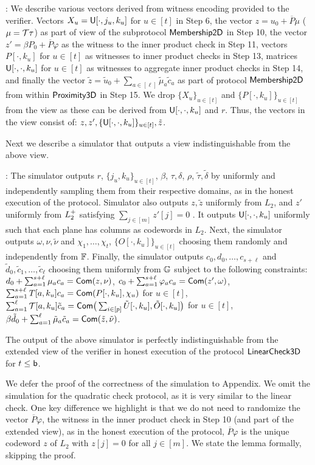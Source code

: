 : We describe various vectors derived from
witness encoding provided to the verifier. Vectors $X_u=\mathsf{U}[\cdot,j_u,k_u]$
for $u\in [t]$ in Step 6, the vector $z=u_0 + \overline{P}\mu$ ($\mu=\mathcal{T}\tau$) as
part of view of the subprotocol $\mathsf{Membership2D}$ in Step 10, the vector
$z'=\beta P_0+\overline{P}\varphi$ as the witness to the inner product check in Step
11, vectors $P[\cdot,k_u]$ for $u\in [t]$ as witnesses to inner product checks
in Step 13, matrices $\mathsf{U}[\cdot,\cdot,k_u]$ for $u\in [t]$ as witnesses to
aggregate inner product checks in Step 14, and finally the vector
$\tilde{z}=\tilde{u}_0 + \sum_{a\in [\ell]}\tilde{\mu}_a\tilde{c}_a$ as part of
protocol $\mathsf{Membership2D}$ from within $\mathsf{Proximity3D}$ in Step 15. We drop
$\{X_u\}_{u\in [t]}$ and $\{P[\cdot,k_u]\}_{u\in [t]}$ from the view as these
can be derived from $\mathsf{U}[\cdot,\cdot,k_u]$ and $r$. Thus, the vectors in the
view consist of: $z,z',\{\mathsf{U}[\cdot,\cdot,k_u]\}_{u\in [t]},\tilde{z}$.

Next we describe a simulator that outputs a view indistinguishable from the
above view.

: The simulator outputs $r$, $\{j_u,k_u\}_{u\in [t]}$,
$\beta$, $\tau,\delta$, $\rho$, $\tilde{\tau},\tilde{\delta}$ by uniformly and
independently sampling them from their respective domains, as in the honest
execution of the protocol. Simulator also outputs $z,\tilde{z}$ uniformly from
$L_2$, and $z'$ uniformly from $L^{+}_2$ satisfying $\sum_{j\in [m]}z'[j]=0$ . It outputs
$\mathsf{U}[\cdot,\cdot,k_u]$ uniformly such that each plane has columns as codewords
in $L_2$. 
Next, the simulator outputs $\omega,\nu,\tilde{\nu}$
and $\chi_1,\ldots,\chi_t$, $\{O[\cdot,k_u]\}_{u\in [t]}$ choosing them randomly and
independently from $\mathbb{F}$. Finally, the simulator outputs
$c_0,d_0,\ldots,c_{s+\ell}$ and $\tilde{d}_0,\tilde{c}_1,\ldots,\tilde{c}_\ell$ choosing 
them uniformly from $\mathbb{G}$ subject to the following constraints:
$d_0 + \sum_{a=1}^{s+\ell}\mu_ac_a = \mathsf{Com}(z,\nu)$,
$c_0 + \sum_{a=1}^{s+\ell}\varphi_ac_a = \mathsf{Com}(z',\omega)$,
$\sum_{a=1}^{s+\ell}T[a,k_u]c_a = \mathsf{Com}(P[\cdot,k_u],\chi_u)$ for $u\in [t]$,
$\sum_{a=1}^{\ell}\mathcal{T}[a,k_u]\tilde{c}_a = \mathsf{Com}\big(\sum_{i\in
[p]}\tilde{U}[\cdot,k_u],\tilde{O}[\cdot, k_u]\big)$ for $u\in [t]$,
$\beta\tilde{d}_0 + \sum_{a=1}^{\ell}\tilde{\mu}_a\tilde{c}_a =
\mathsf{Com}(\tilde{z},\tilde{\nu})$. 

\begin{lemma}\label{lem:simlincheck}
The output of the above simulator is perfectly indistinguishable
from the extended view of the verifier in honest execution of the protocol
$\mathsf{LinearCheck3D}$ for $t\leq \mathsf{b}$.
\end{lemma}
We defer the proof of the correctness of the simulation to Appendix.
We omit the simulation for the quadratic check protocol, as it is very similar
to the linear check. One key difference we highlight is that we do not need to
randomize the vector $\overline{P}\varphi$, the witness in the inner product check in
Step 10 (and part of the extended view), as in the honest execution of the
protocol, $\overline{P}\varphi$ is the unique codeword $z$ of $L_2$ with $z[j]=0$ for
all $j\in [m]$. We state the lemma formally, skipping the proof.

